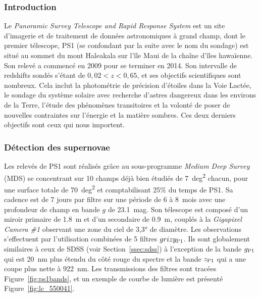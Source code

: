 \documentclass[../main/main.tex]{subfiles}
\begin{document}
\subsubsection{Introduction}\label{sssec:ps1intro}

Le \textit{Panoramic Survey Telescope and Rapid Response System}
\citep[Pan-STARRS,][]{chambers2016, scolnic2018} est un site d'imagerie et de
traitement de données astronomiques à grand champ, dont le premier télescope,
PS1 (se confondant par la suite avec le nom du sondage) est situé au sommet du
mont Haleakala sur l'île Maui de la chaîne d'îles hawaïenne. Son relevé a
commencé en 2009 pour se terminer en 2014. Son intervalle de redshifts sondés
s'étant de $0,02 < z < 0,65$, et ses objectifs scientifiques sont nombreux. Cela
inclut la photométrie de précision d'étoiles dans la Voie Lactée, le sondage du
système solaire avec recherche d'astres dangereux dans les environs de la Terre,
l'étude des phénomènes transitoires et la volonté de poser de nouvelles
contraintes sur l'énergie et la matière sombres. Ces deux derniers objectifs
sont ceux qui nous importent. 

\subsubsection{Détection des supernovae}\label{sssec:ps1detec}

Les relevés de PS1 sont réalisés grâce au sous-programme \textit{Medium Deep
Survey} (MDS) se concentrant sur 10 champs déjà bien étudiés de \SI{7}{deg^2}
chacun, pour une surface totale de \SI{70}{deg^2} et comptabilisant 25\% du
temps de PS1. Sa cadence est de 7 jours par filtre sur une période de 6 à
\SI{8}{mois} avec une profondeur de champ en bande $g$ de \SI{23,1}{mag}. Son
télescope \citep{hodapp2004} est composé d'un miroir primaire de \SI{1,8}{m} et
d'un secondaire de \SI{0,9}{m}, couplés à la \textit{Gigapixel Camera \#1}
\citep[GPC1,][]{kaiser2010, tonry2006} observant une zone du ciel de \ang{3,3;;}
de diamètre. Les observations s'effectuent par l'utilisation combinées de 5
filtres $grizy_{\rm P1}$. Ils sont globalement similaires à ceux de SDSS (voir
Section~\ref{ssec:sdss}) à l'exception de la bande $g_{\rm P1}$ qui est
\SI{20}{nm} plus étendu du côté rouge du spectre et la bande $z_{\rm P1}$ qui a
une coupe plus nette à \SI{922}{nm}. Les transmissions des filtres sont tracées
Figure~\ref{fig:ps1bands}, et un exemple de courbe de lumière est présenté
Figure~\ref{fig:lc_550041}.
\end{document}

